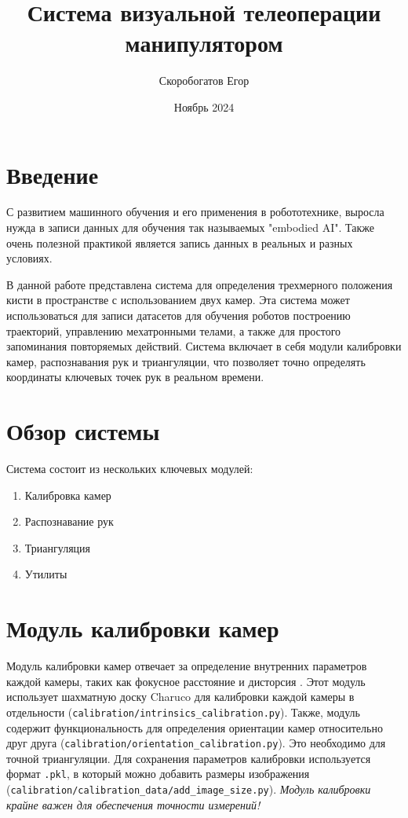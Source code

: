 \documentclass[12pt, a4paper]{article}
\title{Система визуальной телеоперации манипулятором}
\author{Скоробогатов Егор}
\date{Ноябрь 2024}
\begin{document}
\onehalfspacing

\maketitle

\section{Введение}

    С развитием машинного обучения и его применения в робототехнике, выросла нужда в записи данных для обучения так называемых "embodied AI". 
    Также очень полезной практикой является запись данных в реальных и разных условиях.

    В данной работе представлена система для определения трехмерного положения кисти в пространстве с использованием двух камер.
    Эта система может использоваться для записи датасетов для обучения роботов построению траекторий, управлению мехатронными телами, а также для простого запоминания повторяемых действий.
    Система включает в себя модули калибровки камер, распознавания рук и триангуляции, что позволяет точно определять координаты ключевых точек рук в реальном времени.

\section{Обзор системы}

Система состоит из нескольких ключевых модулей:
\begin{enumerate}
    \item Калибровка камер
    \item Распознавание рук
    \item Триангуляция
    \item Утилиты
\end{enumerate}

\section{Модуль калибровки камер}

Модуль калибровки камер отвечает за определение внутренних параметров каждой камеры, таких как фокусное расстояние и дисторсия \cite{zhang2000flexible}. Этот модуль использует шахматную доску Charuco для калибровки каждой камеры в отдельности (\texttt{calibration/intrinsics\_calibration.py}). Также, модуль содержит функциональность для определения ориентации камер относительно друг друга (\texttt{calibration/orientation\_calibration.py}). Это необходимо для точной триангуляции. Для сохранения параметров калибровки используется формат \texttt{.pkl}, в который можно добавить размеры изображения (\texttt{calibration/calibration\_data/add\_image\_size.py}).
\textit{Модуль калибровки крайне важен для обеспечения точности измерений!}
\end{document}
